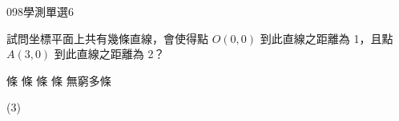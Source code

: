 \begin{QUESTIONS}
\begin{QUESTION}
        \begin{ExamInfo}{098}{學測}{單選}{6}
        \end{ExamInfo}
        \begin{ExamAnsRateInfo}{33}{58}{27}{14}
        \end{ExamAnsRateInfo}
        \begin{QBODY}
			試問坐標平面上共有幾條直線，會使得點 $O(0,0)$ 到此直線之距離為 1，且點 $A(3,0)$ 到此直線之距離為 2？
			\begin{QOPS} 
				 條        
				 條 
				 條 
				 條 
				\QOP 無窮多條
			\end{QOPS}
        \end{QBODY}
        \begin{QFROMS}
        \end{QFROMS}
        \begin{QTAGS}\end{QTAGS}
        \begin{QANS}
            (3)
        \end{QANS}
        \begin{QSOLLIST}
        \end{QSOLLIST}
        \begin{QEMPTYSPACE}
        \end{QEMPTYSPACE}
    \end{QUESTION}
\end{QUESTIONS}
